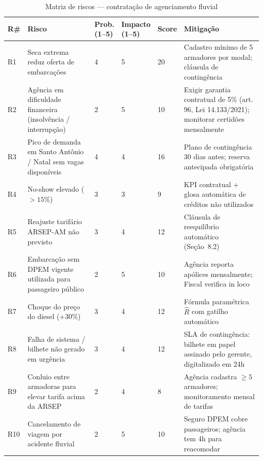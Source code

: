 \documentclass[12pt,a4paper]{article}
\newcommand{\art}[1]{art.\,#1}
\begin{document}
\begin{table}[H]\centering
\caption{Matriz de riscos --- contratação de agenciamento fluvial}
\small{}
\begin{tabular}{C{0.6cm} L{3.8cm} C{1.3cm} C{1.3cm} C{1.3cm} L{4.5cm}}
  \color{white}\textbf{R\#} &
  \color{white}\textbf{Risco} &
  \color{white}\textbf{Prob.\newline (1--5)} &
  \color{white}\textbf{Impacto\newline (1--5)} &
  \color{white}\textbf{Score} &
  \color{white}\textbf{Mitigação} \\
  \toprule
  R1 & Seca extrema reduz oferta de embarcações & 4 & 5 & 20 &
    Cadastro mínimo de 5 armadores por modal; cláusula de contingência \\
  R2 & Agência em dificuldade financeira
    (insolvência / interrupção) & 2 & 5 & 10 &
    Exigir garantia contratual de 5\% (\art{96}, Lei 14.133/2021);
    monitorar certidões mensalmente \\
  R3 & Pico de demanda em Santo Antônio /
    Natal sem vagas disponíveis & 4 & 4 & 16 &
    Plano de contingência 30 dias antes; reserva antecipada obrigatória \\
  R4 & No-show elevado ($> 15\%$) & 3 & 3 & 9 &
    KPI contratual + glosa automática de créditos não utilizados \\
  R5 & Reajuste tarifário ARSEP-AM não previsto & 3 & 4 & 12 &
    Cláusula de reequilíbrio automático (Seção~8.2) \\
  R6 & Embarcação sem DPEM vigente utilizada
    para passageiro público & 2 & 5 & 10 &
    Agência reporta apólices mensalmente; Fiscal verifica in loco \\
  R7 & Choque do preço do diesel (+30\%) & 3 & 4 & 12 &
    Fórmula paramétrica $\hat{R}$ com gatilho automático \\
  R8 & Falha de sistema / bilhete não gerado
    em urgência & 3 & 4 & 12 &
    SLA de contingência: bilhete em papel assinado pelo gerente,
    digitalizado em 24h \\
  R9 & Conluio entre armadoras para elevar tarifa
    acima da ARSEP & 2 & 4 & 8 &
    Agência cadastra $\geq 5$ armadores; monitoramento mensal de tarifas \\
  R10 & Cancelamento de viagem por acidente
    fluvial & 2 & 5 & 10 &
    Seguro DPEM cobre passageiros; agência tem 4h para reacomodar \\
  \bottomrule
\end{tabular}
\end{table}
\end{document}
